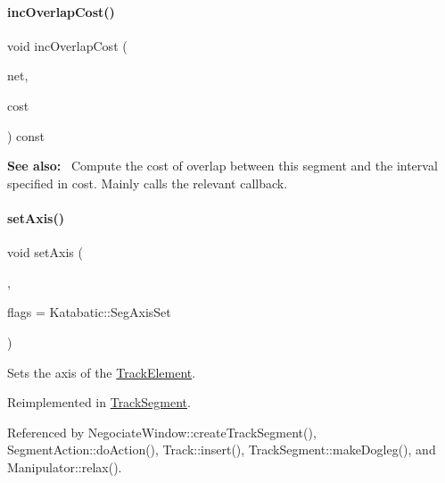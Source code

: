 \mbox{\label{classKite_1_1TrackElement_a7f1126d43df68dd4edbb8d047a134edb}} 
\paragraph{\texorpdfstring{inc\+Overlap\+Cost()}{incOverlapCost()}}
{\footnotesize\ttfamily void inc\+Overlap\+Cost (\begin{DoxyParamCaption}\item[{\textbf{ Net} $\ast$}]{net,  }\item[{Track\+Cost \&}]{cost }\end{DoxyParamCaption}) const\hspace{0.3cm}{\ttfamily [virtual]}}

{\bfseries See also\+:}~ Compute the cost of overlap between this segment and the interval specified in {\ttfamily cost}. Mainly calls the relevant callback. \mbox{\label{classKite_1_1TrackElement_a45e685b1e3ee630d24bf43746553af4c}} 
\paragraph{\texorpdfstring{set\+Axis()}{setAxis()}}
{\footnotesize\ttfamily void set\+Axis (\begin{DoxyParamCaption}\item[{\textbf{ Db\+U\+::\+Unit}}]{,  }\item[{unsigned int}]{flags = {\ttfamily Katabatic\+:\+:SegAxisSet} }\end{DoxyParamCaption})\hspace{0.3cm}{\ttfamily [virtual]}}

Sets the axis of the \mbox{\hyperlink{classKite_1_1TrackElement}{Track\+Element}}. 

Reimplemented in \mbox{\hyperlink{classKite_1_1TrackSegment_a262a915c38127d3722ec561b30d80f91}{Track\+Segment}}.



Referenced by Negociate\+Window\+::create\+Track\+Segment(), Segment\+Action\+::do\+Action(), Track\+::insert(), Track\+Segment\+::make\+Dogleg(), and Manipulator\+::relax().

